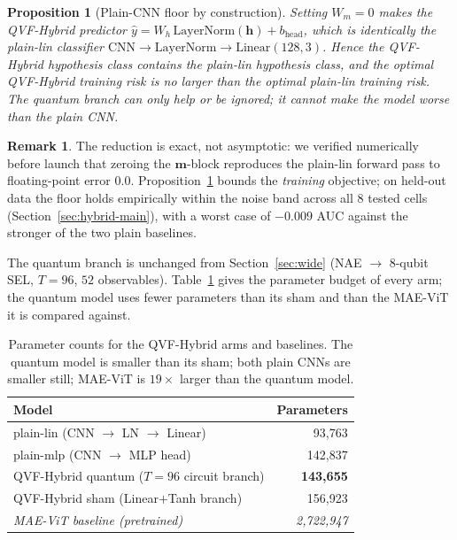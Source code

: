 \documentclass[10pt,letterpaper]{article}
\theoremstyle{plain}
\newtheorem{proposition}{Proposition}
\theoremstyle{definition}
\newtheorem{remark}{Remark}
\begin{document}
\begin{proposition}[Plain-CNN floor by construction]
\label{prop:floor}
Setting $W_m = 0$ makes the QVF-Hybrid predictor
$\hat{y} = W_h\,\mathrm{LayerNorm}(\mathbf{h}) + b_\mathrm{head}$, which is
\emph{identically} the plain-lin classifier
$\mathrm{CNN}\to\mathrm{LayerNorm}\to\mathrm{Linear}(128,3)$.
Hence the QVF-Hybrid hypothesis class contains the plain-lin hypothesis class,
and the optimal QVF-Hybrid training risk is no larger than the optimal plain-lin
training risk. The quantum branch can only help or be ignored; it cannot make the
model worse than the plain CNN.
\end{proposition}

\begin{remark}
The reduction is exact, not asymptotic: we verified numerically before launch
that zeroing the $\mathbf{m}$-block reproduces the plain-lin forward pass to
floating-point error $0.0$. Proposition~\ref{prop:floor} bounds the
\emph{training} objective; on held-out data the floor holds empirically within the
noise band across all 8 tested cells (Section~\ref{sec:hybrid-main}), with a worst
case of $-0.009$ AUC against the stronger of the two plain baselines.
\end{remark}

The quantum branch is unchanged from Section~\ref{sec:wide}
(NAE $\to$ 8-qubit SEL, $T{=}96$, $52$ observables). Table~\ref{tab:params}
gives the parameter budget of every arm; the quantum model uses fewer parameters
than its sham and than the MAE-ViT it is compared against.

\begin{table}[h!]
\centering
\caption{Parameter counts for the QVF-Hybrid arms and baselines. The quantum
model is smaller than its sham; both plain CNNs are smaller still; MAE-ViT is
$19\times$ larger than the quantum model.}
\label{tab:params}
\begin{tabular}{@{}lr@{}}
\toprule
Model & Parameters \\
\midrule
plain-lin (CNN $\to$ LN $\to$ Linear) & 93,763 \\
plain-mlp (CNN $\to$ MLP head) & 142,837 \\
QVF-Hybrid quantum ($T{=}96$ circuit branch) & \textbf{143,655} \\
QVF-Hybrid sham (Linear$+$Tanh branch) & 156,923 \\
\midrule
\textit{MAE-ViT baseline (pretrained)~\cite{prasha2025masked}} & \textit{2,722,947} \\
\bottomrule
\end{tabular}
\end{table}
\end{document}

